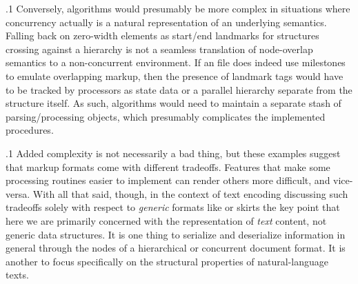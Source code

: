 \documentclass[11pt, twocolumn]{article}
\begin{document}
\p.1{%
Conversely,  algorithms would presumably be more
complex in situations where concurrency actually
is a natural representation of an underlying
semantics. Falling back on zero-width elements
as start/end landmarks for structures crossing
against a  hierarchy is not a seamless translation
of node-overlap semantics to a non-concurrent
environment. If an  file does
indeed use milestones to emulate overlapping markup,
then the presence of landmark tags would have to be
tracked by  processors as state data or
a parallel hierarchy separate from the  structure
itself. As such, algorithms would need to maintain
a separate stash of parsing/processing objects,
which presumably complicates the implemented procedures.
}%

\p.1{%
Added complexity is not necessarily a bad thing, but these
examples suggest that markup formats come with different
tradeoffs. Features that make some processing
routines easier to implement can render others more difficult,
and vice-versa. With all that said, though, in the context of text encoding
discussing such tradeoffs solely with respect to
\textit{generic} formats like  or  skirts the
key point that here we are primarily concerned with
the representation of \textit{text} content, not generic
data structures. It is one thing to serialize and deserialize
information in general through the nodes of a hierarchical
or concurrent document format. It is another to focus
specifically on the structural properties of natural-language texts.
}%
\end{document}
